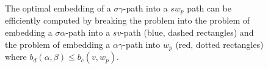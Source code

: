 \begin{figure}[ht]
\centering

\caption[]{
\label{fig:dp1}
The optimal embedding of a $\sigma \gamma $-path into a $sw_p$ path can be efficiently 
computed by breaking the problem into the problem of embedding a $\sigma \alpha $-path
into a $sv$-path (blue, dashed rectangles) 
and the problem of embedding a $\alpha \gamma $-path into $w_p$ (red, dotted
rectangles) where $b_d(\alpha , \beta ) \leq b_c(v, w_p)$.
}
\end{figure}
